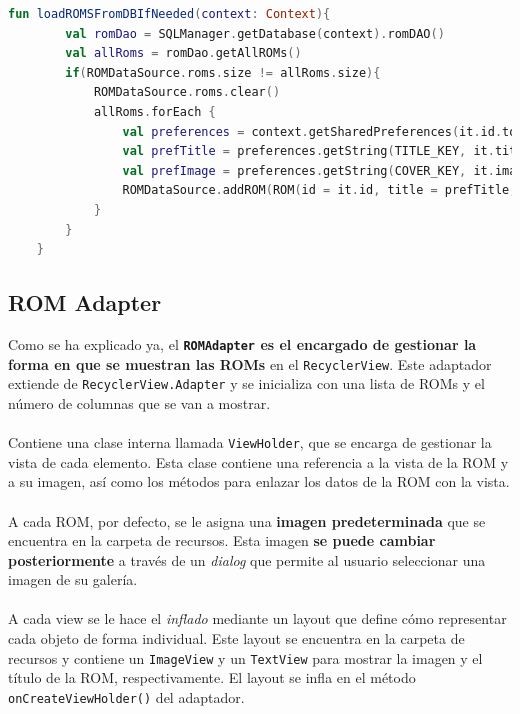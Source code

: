 \begin{lstlisting}[language=Kotlin, caption={ROM Management - Recarga de ROMs en Memoria.}, label={code:romManagementReloadRoms}]
    fun loadROMSFromDBIfNeeded(context: Context){
        val romDao = SQLManager.getDatabase(context).romDAO()
        val allRoms = romDao.getAllROMs()
        if(ROMDataSource.roms.size != allRoms.size){
            ROMDataSource.roms.clear()
            allRoms.forEach {
                val preferences = context.getSharedPreferences(it.id.toString(), Context.MODE_PRIVATE)
                val prefTitle = preferences.getString(TITLE_KEY, it.title)
                val prefImage = preferences.getString(COVER_KEY, it.imageRes)
                ROMDataSource.addROM(ROM(id = it.id, title = prefTitle, imageRes = prefImage))
            }
        }
    }
\end{lstlisting}

\subsection{ROM Adapter}
Como se ha explicado ya, el \textbf{\texttt{ROMAdapter} es el encargado de gestionar la forma en que se muestran las ROMs} en el \texttt{RecyclerView}. Este adaptador extiende de \texttt{RecyclerView.Adapter} y se inicializa con una lista de ROMs y el número de columnas que se van a mostrar.
\\\\
Contiene una clase interna llamada \texttt{ViewHolder}, que se encarga de gestionar la vista de cada elemento. Esta clase contiene una referencia a la vista de la ROM y a su imagen, así como los métodos para enlazar los datos de la ROM con la vista.
\\\\
A cada ROM, por defecto, se le asigna una \textbf{imagen predeterminada} que se encuentra en la carpeta de recursos. Esta imagen \textbf{se puede cambiar posteriormente} a través de un \textit{dialog} que permite al usuario seleccionar una imagen de su galería.
\\\\
A cada view se le hace el \textit{inflado} mediante un layout que define cómo representar cada objeto de forma individual. Este layout se encuentra en la carpeta de recursos y contiene un \texttt{ImageView} y un \texttt{TextView} para mostrar la imagen y el título de la ROM, respectivamente. El layout se infla en el método \texttt{onCreateViewHolder()} del adaptador.

